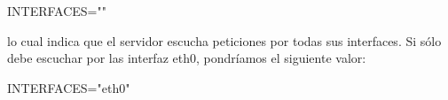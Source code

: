 	\begin{listing}[style=texto, numbers=none]
	INTERFACES=""
 	\end{listing}

lo cual indica que el servidor escucha peticiones por todas sus interfaces. Si sólo debe escuchar por las interfaz eth0, pondríamos el siguiente valor:
	\begin{listing}[style=texto, numbers=none]
	INTERFACES="eth0"
 	\end{listing}
 	
 	






	
